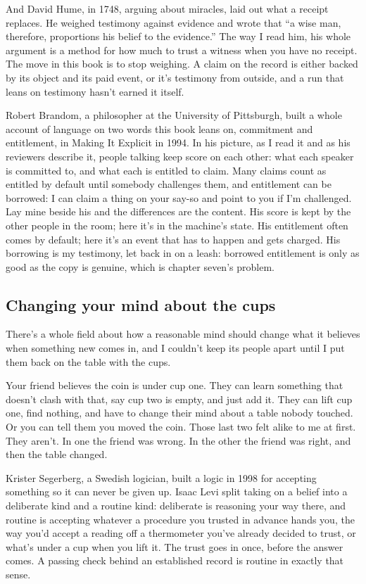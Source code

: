 \documentclass[11pt,twoside]{article}
\theoremstyle{thielethm}
\theoremstyle{thieledef}
\theoremstyle{thieledef}
\theoremstyle{thieledef}
\theoremstyle{thielethm}
\theoremstyle{thieleobs}
\theoremstyle{thielethm}
\begin{document}
And David Hume, in 1748, arguing about miracles, laid out what a receipt replaces. He weighed testimony against evidence and wrote that ``a wise man, therefore, proportions his belief to the evidence.'' The way I read him, his whole argument is a method for how much to trust a witness when you have no receipt. The move in this book is to stop weighing. A claim on the record is either backed by its object and its paid event, or it's testimony from outside, and a run that leans on testimony hasn't earned it itself.

Robert Brandom, a philosopher at the University of Pittsburgh, built a whole account of language on two words this book leans on, commitment and entitlement, in Making It Explicit in 1994. In his picture, as I read it and as his reviewers describe it, people talking keep score on each other: what each speaker is committed to, and what each is entitled to claim. Many claims count as entitled by default until somebody challenges them, and entitlement can be borrowed: I can claim a thing on your say-so and point to you if I'm challenged. Lay mine beside his and the differences are the content. His score is kept by the other people in the room; here it's in the machine's state. His entitlement often comes by default; here it's an event that has to happen and gets charged. His borrowing is my testimony, let back in on a leash: borrowed entitlement is only as good as the copy is genuine, which is chapter seven's problem.

\subsection{Changing your mind about the cups}

There's a whole field about how a reasonable mind should change what it believes when something new comes in, and I couldn't keep its people apart until I put them back on the table with the cups.

Your friend believes the coin is under cup one. They can learn something that doesn't clash with that, say cup two is empty, and just add it. They can lift cup one, find nothing, and have to change their mind about a table nobody touched. Or you can tell them you moved the coin. Those last two felt alike to me at first. They aren't. In one the friend was wrong. In the other the friend was right, and then the table changed.

Krister Segerberg, a Swedish logician, built a logic in 1998 for accepting something so it can never be given up. Isaac Levi split taking on a belief into a deliberate kind and a routine kind: deliberate is reasoning your way there, and routine is accepting whatever a procedure you trusted in advance hands you, the way you'd accept a reading off a thermometer you've already decided to trust, or what's under a cup when you lift it. The trust goes in once, before the answer comes. A passing check behind an established record is routine in exactly that sense.
\end{document}
